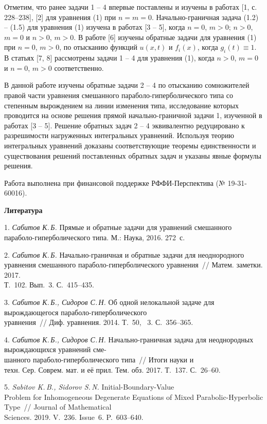Отметим, что ранее задачи 1 -- 4 впервые поставлены и изучены в работах [1, с. 228--238], [2] для уравнения (1) при $n=m=0$. Начально-граничная задача (1.2) -- (1.5) для уравнения (1) изучена в работах [3 -- 5], когда $n=0$, $m>0$; $n>0$, $m=0$ и $n>0$, $m>0$.
В работе [6] изучены обратные задачи для уравнения (1) при $n=0$, $m>0$, по отысканию функций $u(x,t)$ и $f_i(x)$, когда $g_i(t)\equiv1$. В статьях [7, 8] рассмотрены задачи 1 -- 4 для уравнения (1), когда $n>0$, $m=0$ и $n=0$, $m>0$ соответственно.


В данной работе изучены обратные задачи 2 -- 4 по отысканию сомножителей правой части уравнения смешанного параболо-гиперболического типа со степенным вырождением на линии изменения типа, исследование которых проводится на основе решения прямой начально-граничной задачи 1, изученной в работах [3 -- 5]. Решение обратных задач 2 -- 4 эквивалентно редуцировано к разрешимости нагруженных интегральных уравнений. Используя теорию интегральных уравнений доказаны соответствующие теоремы единственности и существования решений поставленных обратных задач и указаны явные формулы решения.

Работа выполнена при финансовой поддержке РФФИ-Перспектива (№ 19-31-60016).

\smallskip \centerline {\bf Литература} \nopagebreak

1. {\it Сабитов К.\,Б.} {Прямые и обратные задачи для уравнений смешанного параболо-гиперболического типа. М.: Наука, 2016. 272~с.}

2. {\it Сабитов К.\,Б.} {Начально-граничная и обратные задачи для неоднородного уравнения смешанного параболо-гиперболического уравнения~// Матем. заметки. 2017.\\Т.~102. Вып.~3. С.~415--435.}

3. {\it Сабитов К.\,Б., Сидоров С.\,Н.} {Об одной нелокальной задаче для вырождающегося па\-ра\-бо\-ло-гиперболического\\уравнения~// Диф. уравнения. 2014. Т.~50, \No~3. С.~356--365.}

4. {\it Сабитов К.\,Б., Сидоров С.\,Н.} {Начально-граничная задача для неоднородных вырождающихся уравнений сме-\\шанного параболо-гиперболического типа~// Итоги науки и\\техн. Сер. Соврем. мат. и её прил. Тем. обз. 2017. Т.~137. С.~26--60.}

5. {\it Sabitov K.\,B., Sidorov S.\,N.} {Initial-Boundary-Value\\Problem for Inhomogeneous Degenerate Equations of Mixed Parabolic-Hyperbolic Type~// Journal of Mathematical\\Sciences. 2019. V.~236. Issue~6. P.~603--640.}

